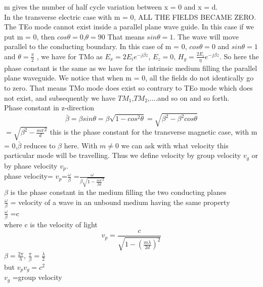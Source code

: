 m gives the number of half cycle variation between x = 0 and x = d.\\
In the transverse electric case with m = 0, ALL THE FIELDS BECAME ZERO.\\
The TEo mode cannot exist inside a parallel plane wave guide.
In this case if we put m = 0, then $cos\theta =0$,$\theta =90$ That means $sin\theta =1$.
The wave will move parallel to the conducting boundary. In this case of m = 0, $cos\theta =0$ and $sin\theta =1$ and $\theta=\frac{\pi}{2}$ , we have for TMo as $E_{x} =2E_{i} e^{-j\beta z}$, $E_{z}= 0$, $H_{y} =\frac{2E_{i}}{\eta} e^{-j\beta z}$. So here the phase constant is the same as we have for the intrinsic medium filling the parallel plane waveguide. We notice that when m = 0, all the fields do not identically go to zero. That means TMo mode does exist so contrary to TEo mode which does not exist, and subsequently we have $TM_{1}$,$TM_{2}$,....and so on and so forth.\\
Phase constant in z-direction\\
\begin{equation*}
\bar{\beta} = \beta sin\theta = \beta \sqrt{1- cos^{2}\theta} =\sqrt{\beta^{2} -\beta^{2}cos\theta}
\end{equation*}
$=\sqrt{\beta^{2} -\frac{m\pi}{d}^{2}}$
this is the phase constant for the transverse magnetic case, with m = 0,$\bar{\beta}$ reduces to $\beta$ here. With $m\neq 0$ we can ask with what velocity this particular mode will be travelling. Thus we define velocity by group velocity $v_{g}$ or by phase velocity $v_{p}$.\\
phase velocity= $v_{p}$=$\frac{\omega}{\beta}$ =$\frac{\omega}{\beta \sqrt{1- \frac{m \pi}{\beta d}^{2}}}$\\
$\beta$ is the phase constant in the medium filling the two conducting planes\\
$\frac{\omega}{\beta}$ = velocity of a wave in an unbound medium having the same property\\
$\frac{\omega}{\beta}$ =c\\
where c is the velocity of light\\
\begin{equation*}
v_{p} =\frac{c}{\sqrt{1-(\frac{m\lambda}{2d})^{2}}}
\end{equation*}
$\beta =\frac{2\pi}{\lambda}$, $\frac{\pi}{\beta} =\frac{\lambda}{2}$\\
but $v_{p} v_{g}= c^{2}$\\
$v_{g}$ =group velocity\\
